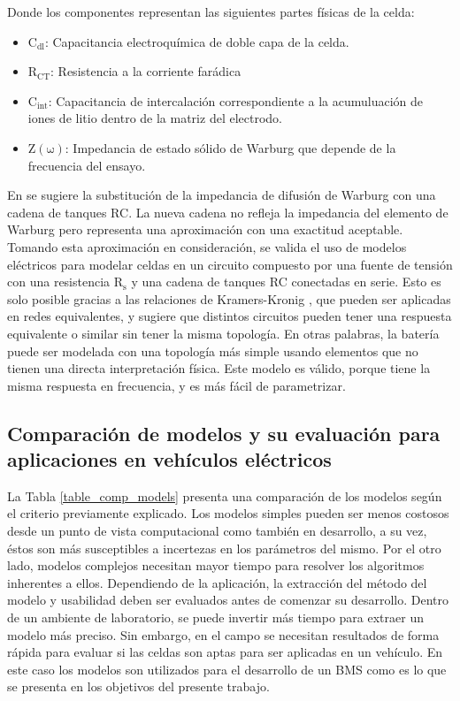 \noindent Donde los componentes representan las siguientes partes f\'isicas de 
la celda:

\begin{itemize}
    \item $\mathrm{C_{dl}}$: Capacitancia electroqu\'imica de doble capa
        de la celda.
    \item $\mathrm{R_{CT}}$: Resistencia a la corriente
        far\'adica
    \item $\mathrm{C_{int}}$: Capacitancia de intercalaci\'on
        correspondiente a la acumuluaci\'on de iones de litio dentro de la
        matriz del electrodo.
    \item $\mathrm{Z(\omega)}$: Impedancia de estado s\'olido de Warburg
        que depende de la frecuencia del ensayo.
\end{itemize}

\noindent En \cite{Moss} se sugiere la substituci\'on de la impedancia de 
difusi\'on de Warburg con una cadena de tanques RC. La nueva cadena no refleja 
la impedancia del elemento de Warburg pero representa una aproximaci\'on 
con una exactitud aceptable. Tomando esta aproximaci\'on en consideraci\'on, se 
valida el uso de modelos el\'ectricos para modelar celdas en un circuito 
compuesto por una fuente de tensi\'on con una resistencia $\mathrm{R_s}$ y una 
cadena de tanques RC conectadas en serie. Esto es solo posible gracias a las 
relaciones de Kramers-Kronig \cite{Schmidt2013}, que pueden ser aplicadas en 
redes equivalentes, y sugiere que distintos circuitos pueden tener una respuesta 
equivalente o similar sin tener la misma topolog\'ia. En otras palabras, la 
bater\'ia puede ser modelada con una topolog\'ia m\'as simple usando elementos 
que no tienen una directa interpretaci\'on f\'isica. Este modelo es v\'alido, 
porque tiene la misma respuesta en frecuencia, y es m\'as f\'acil de 
parametrizar.

\subsection{Comparaci\'on de modelos y su evaluaci\'on para aplicaciones
en veh\'iculos el\'ectricos}\label{compModels}

\noindent La Tabla \ref{table_comp_models} presenta una comparaci\'on de los
modelos seg\'un el criterio previamente explicado. Los modelos simples pueden
ser menos costosos desde un punto de vista computacional como tambi\'en en
desarrollo, a su vez, \'estos son más susceptibles a incertezas en los
par\'ametros del mismo. Por el otro lado, modelos complejos necesitan mayor
tiempo para resolver los algoritmos inherentes a ellos.  Dependiendo de la
aplicaci\'on, la extracci\'on del m\'etodo del modelo y usabilidad deben ser
evaluados antes de comenzar su desarrollo.  Dentro de un ambiente de
laboratorio, se puede invertir m\'as tiempo para extraer un modelo m\'as
preciso. Sin embargo, en el campo se necesitan resultados de forma r\'apida para
evaluar si las celdas son aptas para ser aplicadas en un veh\'iculo. 
En este caso los modelos son utilizados para el desarrollo de un
\acrshort{BMS} como es lo que se presenta en los objetivos del presente trabajo. 

